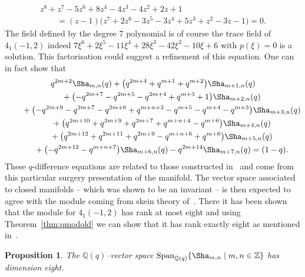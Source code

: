 \documentclass[pdftex]{sigma}
\numberwithin{equation}{section}
\newtheorem{Proposition}[Theorem]{Proposition}
 { \theoremstyle{definition}
\newtheorem{Definition}[Theorem]{Definition}
\newtheorem{Note}[Theorem]{Note}
\newtheorem{Example}[Theorem]{Example}
\newtheorem{Remark}[Theorem]{Remark} }
\def\BZ{\mathbb{Z}}
\def\BQ{\mathbb{Q}}
\def\WRT{\Sha}
\def\BZ{\mathbb Z}
\def\BQ{\mathbb Q}
\begin{document}
\begin{gather*}
 z^8+z^7-5z^6+8z^4-4z^3-4z^2+2z+1\nonumber\\
 \qquad{}=(z-1)\bigl(z^7+2z^6-3z^5-3z^4+5z^3+z^2-3z-1\bigr)=0 .\label{eq:z.pol}
\end{gather*}
The field defined by the degree $7$ polynomial is of course the trace field of $4_1(-1,2)$ indeed $7\xi^6 + 2\xi^5 - 11\xi^4 + 28\xi^3 - 42\xi^2 - 10\xi + 6$ with $p(\xi)=0$ is a solution. This factorisation could suggest a refinement of this equation. One can in fact show that
\begin{gather*}
 q^{2m+2}\WRT_{m,n}(q)+\bigl(q^{2m+4}+q^{m+1}+q^{m+2}\bigr)\WRT_{m+1,n}(q)\nonumber\\
 \qquad{}+\bigl(-q^{2m+7}-q^{2m+5}-q^{2m+4}+q^{m+3}+1\bigr)\WRT_{m+2,n}(q)\nonumber\\
 \qquad{}+\bigl(-q^{2m+9}-q^{2m+7}-q^{2m+6}+q^{m+n+3}-q^{m+5}-q^{m+4}-q^{m+3}\bigr)\WRT_{m+3,n}(q)\nonumber\\
 \qquad{}+\bigl(q^{2m+10}+q^{2m+9}+q^{2m+7}+q^{m+n+4}-q^{m+6}\bigr)\WRT_{m+4,n}(q)\nonumber\\
 \qquad{}+\bigl(q^{2m+12}+q^{2m+11}+q^{2m+9}-q^{m+n+6}+q^{m+6}\bigr)\WRT_{m+5,n}(q)\nonumber\\
 \qquad{}+\bigl(-q^{2m+12}-q^{m+n+7}\bigr)\WRT_{m+6,n}(q)-q^{2m+14}\WRT_{m+7,n}(q) =(1-q) .\label{7thorderqdiffinhom}
\end{gather*}
These $q$-difference equations are related to those constructed in~\cite[Theorem 1]{Wh:thesis} and come from this particular surgery presentation of the manifold. The vector space associated to closed manifolds -- which was shown to be an invariant -- is then expected to agree with the module coming from skein theory of~\cite{GarLe:module}. There it has been shown that the module for $4_1(-1,2)$ has rank at most eight and using Theorem~\ref{thm:qmodold} we can show that it has rank exactly eight as mentioned in~\mbox{\cite[Example 3.3]{GarLe:module}}.
\begin{Proposition}
The $\BQ(q)$--vector space $\mathrm{Span}_{\BQ(q)}\{\WRT_{m,n}\mid m,n\in\BZ\}$ has dimension eight.
\end{Proposition}
\end{document}
